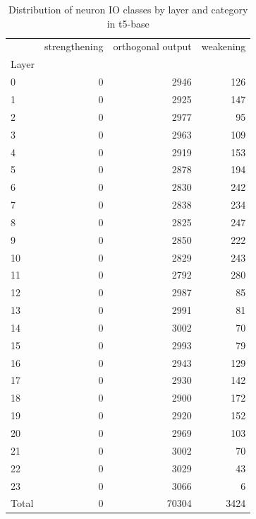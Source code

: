 \begin{table}
\caption{Distribution of neuron IO classes by layer and category in t5-base}
\label{tab:t5-base}
\begin{tabular}{lrrr}
 & strengthening & orthogonal output & weakening \\
Layer &  &  &  \\
0 & 0 & 2946 & 126 \\
1 & 0 & 2925 & 147 \\
2 & 0 & 2977 & 95 \\
3 & 0 & 2963 & 109 \\
4 & 0 & 2919 & 153 \\
5 & 0 & 2878 & 194 \\
6 & 0 & 2830 & 242 \\
7 & 0 & 2838 & 234 \\
8 & 0 & 2825 & 247 \\
9 & 0 & 2850 & 222 \\
10 & 0 & 2829 & 243 \\
11 & 0 & 2792 & 280 \\
12 & 0 & 2987 & 85 \\
13 & 0 & 2991 & 81 \\
14 & 0 & 3002 & 70 \\
15 & 0 & 2993 & 79 \\
16 & 0 & 2943 & 129 \\
17 & 0 & 2930 & 142 \\
18 & 0 & 2900 & 172 \\
19 & 0 & 2920 & 152 \\
20 & 0 & 2969 & 103 \\
21 & 0 & 3002 & 70 \\
22 & 0 & 3029 & 43 \\
23 & 0 & 3066 & 6 \\
Total & 0 & 70304 & 3424 \\
\end{tabular}
\end{table}
